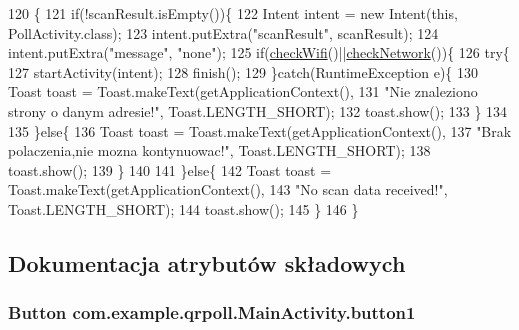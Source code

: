 \begin{DoxyCode}
120                                                  \{
121         \textcolor{keywordflow}{if}(!scanResult.isEmpty())\{
122             Intent intent = \textcolor{keyword}{new} Intent(\textcolor{keyword}{this}, PollActivity.class);
123             intent.putExtra(\textcolor{stringliteral}{"scanResult"}, scanResult);
124             intent.putExtra(\textcolor{stringliteral}{"message"}, \textcolor{stringliteral}{"none"});
125             \textcolor{keywordflow}{if}(\hyperlink{classcom_1_1example_1_1qrpoll_1_1_main_activity_a0433b5df97dcca7db8593f32d8d033b9}{checkWifi}()||\hyperlink{classcom_1_1example_1_1qrpoll_1_1_main_activity_af92255e3a196405eeb55e06bb625d435}{checkNetwork}())\{
126                 \textcolor{keywordflow}{try}\{
127                 startActivity(intent);
128                 finish();
129                 \}\textcolor{keywordflow}{catch}(RuntimeException e)\{
130                     Toast toast = Toast.makeText(getApplicationContext(),
131                             \textcolor{stringliteral}{"Nie znaleziono strony o danym adresie!"}, Toast.LENGTH\_SHORT);
132                         toast.show();
133                 \}
134                 
135             \}\textcolor{keywordflow}{else}\{
136                 Toast toast = Toast.makeText(getApplicationContext(),
137                         \textcolor{stringliteral}{"Brak polaczenia,nie mozna kontynuowac!"}, Toast.LENGTH\_SHORT);
138                     toast.show();
139             \}
140         
141         \}\textcolor{keywordflow}{else}\{
142             Toast toast = Toast.makeText(getApplicationContext(),
143                     \textcolor{stringliteral}{"No scan data received!"}, Toast.LENGTH\_SHORT);
144                 toast.show();
145         \}
146     \}
\end{DoxyCode}


\subsection{Dokumentacja atrybutów składowych}
\hypertarget{classcom_1_1example_1_1qrpoll_1_1_main_activity_a3c62b040921525ab5c9944e97e08f639}{
\subsubsection[{button1}]{\setlength{\rightskip}{0pt plus 5cm}Button com.\+example.\+qrpoll.\+Main\+Activity.\+button1\hspace{0.3cm}{\ttfamily [private]}}}\label{classcom_1_1example_1_1qrpoll_1_1_main_activity_a3c62b040921525ab5c9944e97e08f639}



